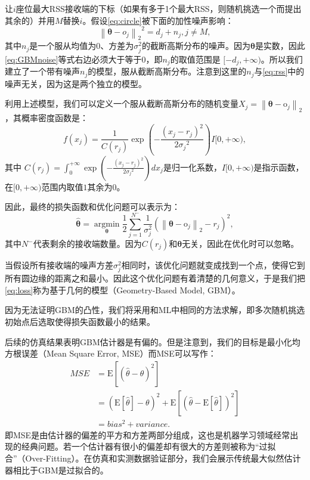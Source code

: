 让$i$座位最大RSS接收端的下标（如果有多于1个最大RSS，则随机挑选一个而提出其余的）并用$M$替换$i$。假设\eqref{eq:circle}被下面的加性噪声影响：
\begin{equation}
{\left\| {\bm{\theta}  - o_j} \right\|_2}^2 = d_j + n_j, j \neq M, \label{eq:GBMnoise}
\end{equation}
其中$n_j$是一个服从均值为$0$、方差为$\sigma_j^2$的截断高斯分布的噪声。因为$\bm{\theta}$是实数，因此\eqref{eq:GBMnoise}等式右边必须大于等于$0$，即$n_j$的取值范围是 $[-d_j, +\infty)$。所以我们建立了一个带有噪声$n_j$的模型，服从截断高斯分布。注意到这里的$n_j$与\eqref{eq:rss}中的噪声无关，因为这是两个独立的模型。

利用上述模型，我们可以定义一个服从截断高斯分布的随机变量$X_j = \left\|{\bm\theta} - \bm{\mathrm{o}}_j\right\|_2$，其概率密度函数是：
\begin{equation}
f(x_j) = \frac{1}{C(r_j)}\exp(-\frac{(x_j - r_j)^2}{2{\sigma_j}^2})I[0, +\infty), \label{eq:pdf}
\end{equation}
其中 $C(r_j) = \int_0^{ + \infty }\exp(-\frac{(x_j - r_j)^2}{2{\sigma_j}^2})dx_j$是归一化系数，$I[0, +\infty)$是指示函数，在$[0, +\infty)$范围内取值$1$其余为$0$。

因此，最终的损失函数和优化问题可以表示为：
\begin{equation}
\widehat {\bm{\theta }} = \mathop {\arg \min }\limits_{\bm{\theta }} \frac{1}{2}\sum\limits_{j = 1}^{N^-} {\frac{1}{\sigma_j^2}(\left\|{\bm\theta} - \bm{\mathrm{o}}_j\right\|_2 - r_j)^2}, \label{eq:loss}
\end{equation}
其中$N^-$代表剩余的接收端数量。因为$C(r_j)$和$\bm\theta$无关，因此在优化时可以忽略。

当假设所有接收端的噪声方差$\sigma_j^2$相同时，该优化问题就变成找到一个点，使得它到所有圆边缘的距离之和最小。因此这个优化问题有着清楚的几何意义，于是我们把\eqref{eq:loss}称为基于几何的模型（Geometry-Based Model, GBM）。

因为无法证明GBM的凸性，我们将采用和ML中相同的方法求解，即多次随机挑选初始点后选取使得损失函数最小的结果。

后续的仿真结果表明GBM估计器是有偏的。但是注意到，我们的目标是最小化均方根误差（Mean Square Error, MSE）而MSE可以写作：
\begin{equation}    \label{eq:mse}
\begin{split}
MSE &= \mathrm{E}[(\widehat{\theta} - \theta)^2]\\
&= (\mathrm{E}[\widehat{\theta}] - \theta)^2 + \mathrm{E}[(\widehat{\theta} - \mathrm{E}[\widehat{\theta}])^2]\\
&= bias^2 + variance.
\end{split}
\end{equation}
即MSE是由估计器的偏差的平方和方差两部分组成，这也是机器学习领域经常出现的经典问题。若一个估计器有很小的偏差却有很大的方差则被称为“过拟合”（Over-Fitting）。在仿真和实测数据验证部分，我们会展示传统最大似然估计器相比于GBM是过拟合的。

